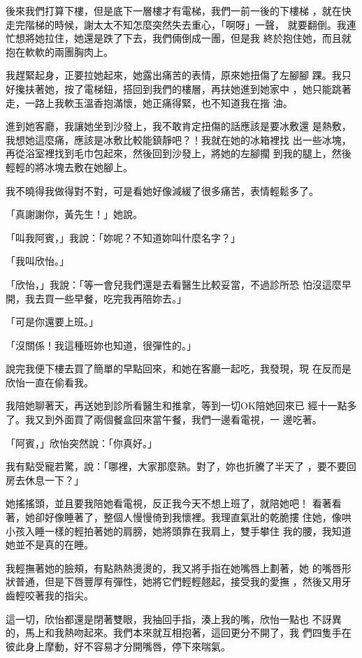 後來我們打算下樓，但是底下一層樓才有電梯，我們一前一後的下樓梯
，就在快走完階梯的時候，謝太太不知怎麼突然失去重心，「啊呀」一聲，
就要翻倒。我連忙想將她拉住，她還是跌了下去，我們倆倒成一團，但是我
終於抱住她，而且就抱在軟軟的兩團胸肉上。

我趕緊起身，正要拉她起來，她露出痛苦的表情，原來她扭傷了左腳腳
踝。我只好攙扶著她，按了電梯鈕，搭回到我們的樓層，再扶她進到她家中
，她只能跳著走，一路上我軟玉溫香抱滿懷，她正痛得緊，也不知道我在揩
油。

進到她客廳，我讓她坐到沙發上，我不敢肯定扭傷的話應該是要冰敷還
是熱敷，我想她這麼痛，應該是冰敷比較能鎮靜吧？！我就在她的冰箱裡找
出一些冰塊，再從浴室裡找到毛巾包起來，然後回到沙發上，將她的左腳擱
到我的腿上，然後輕輕的將冰塊去敷在她腳上。

我不曉得我做得對不對，可是看她好像減緩了很多痛苦，表情輕鬆多了。

「真謝謝你，黃先生！」她說。

「叫我阿賓，」我說：「妳呢？不知道妳叫什麼名字？」

「我叫欣怡。」

「欣怡，」我說：「等一會兒我們還是去看醫生比較妥當，不過診所恐
怕沒這麼早開，我去買一些早餐，吃完我再陪妳去。」

「可是你還要上班。」

「沒關係！我這種班妳也知道，很彈性的。」

說完我便下樓去買了簡單的早點回來，和她在客廳一起吃，我發現，現
在反而是欣怡一直在偷看我。

我陪她聊著天，再送她到診所看醫生和推拿，等到一切OK陪她回來已
經十一點多了。我又到外面買了兩個餐盒回來當午餐，我們一邊看電視，一
邊吃著。

「阿賓，」欣怡突然說：「你真好。」

我有點受寵若驚，說：「哪裡，大家那麼熟。對了，妳也折騰了半天了
，要不要回房去休息一下？」

她搖搖頭，並且要我陪她看電視，反正我今天不想上班了，就陪她吧！
看著看著，她卻好像睡著了，整個人慢慢倚到我懷裡。我理直氣壯的乾脆摟
住她，像哄小孩入睡一樣的輕拍著她的肩膀，她將頭靠在我肩上，雙手攀住
我的腰，我知道她並不是真的在睡。

我輕撫著她的臉頰，有點熱熱燙燙的，我又將手指在她嘴唇上劃著，她
的嘴唇形狀普通，但是下唇豐厚有彈性，她將它們輕輕翹起，接受我的愛撫
，然後又用牙齒輕咬著我的指尖。

這一切，欣怡都還是閉著雙眼，我抽回手指，湊上我的嘴，欣怡一點也
不訝異的，馬上和我熱吻起來。我們本來就互相抱著，這回更分不開了，我
們四隻手在彼此身上摩動，好不容易才分開嘴唇，停下來喘氣。

